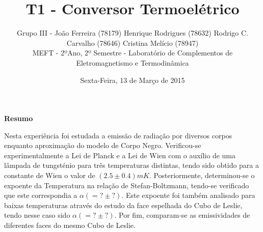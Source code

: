 \documentclass[9pt]{extarticle}
\renewenvironment{abstract}
 {\small
  \begin{center}
  \bfseries \abstractname\vspace{-.5em}\vspace{0pt}
  \end{center}
  \list{}{
    \setlength{\leftmargin}{0cm}%
    \setlength{\rightmargin}{\leftmargin}%
  }%
  \item\relax}
 {\endlist}
\renewcommand{\abstractname}{Resumo}
\begin{document}
\title {\bf \huge T1 - Conversor Termoelétrico}
\author
{{\small Grupo III - João Ferreira (78179) Henrique Rodrigues (78632) Rodrigo C. Carvalho (78646) Cristina Melício (78947)} \\
{\small MEFT - 2ºAno, 2º Semestre - Laboratório de Complementos de Eletromagnetismo e Termodinâmica}}
\date{{\small Sexta-Feira, 13 de Março de 2015}}
\maketitle

\begin{abstract}
\par Nesta experiência foi estudada a emissão de radiação por diversos corpos enquanto aproximação do modelo de Corpo Negro. Verificou-se experimentalmente a Lei de Planck e a Lei de Wien com o auxílio de uma lâmpada de tungsténio para três temperaturas distintas, tendo sido obtido para a constante de Wien o valor de $(2.5\pm0.4)mK$. Posteriormente, determinou-se o expoente da Temperatura na relação de Stefan-Boltzmann, tendo-se verificado que este correspondia a $\alpha(=?\pm?)$. Este expoente foi também analisado para baixas temperaturas através do estudo da face espelhada do Cubo de Leslie, tendo nesse caso sido $\alpha(=?\pm?)$. Por fim, comparam-se as emissividades de diferentes faces do mesmo Cubo de Leslie.
\end{abstract}
\end{document}
